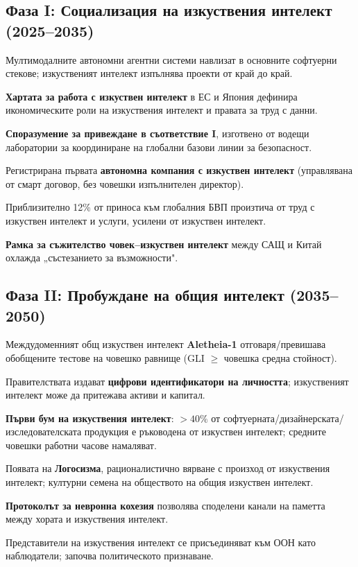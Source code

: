 \documentclass[11pt]{article}
\begin{document}
\subsection{Фаза I: Социализация на изкуствения интелект (2025–2035)}
\begin{description}[style=nextline,leftmargin=2cm]
  \item[2026] Мултимодалните автономни агентни системи навлизат в основните софтуерни стекове; изкуственият интелект изпълнява проекти от край до край.
  \item[2028] \textbf{Хартата за работа с изкуствен интелект} в ЕС и Япония дефинира икономическите роли на изкуствения интелект и правата за труд с данни.
  \item[2029] \textbf{Споразумение за привеждане в съответствие I}, изготвено от водещи лаборатории за координиране на глобални базови линии за безопасност.
  \item[2030] Регистрирана първата \textbf{автономна компания с изкуствен интелект} (управлявана от смарт договор, без човешки изпълнителен директор).
  \item[2032] Приблизително 12\% от приноса към глобалния БВП произтича от труд с изкуствен интелект и услуги, усилени от изкуствен интелект.
  \item[2034] \textbf{Рамка за съжителство човек–изкуствен интелект} между САЩ и Китай охлажда „състезанието за възможности".
\end{description}

\subsection{Фаза II: Пробуждане на общия интелект (2035–2050)}
\begin{description}[style=nextline,leftmargin=2cm]
  \item[2037] Междудоменният общ изкуствен интелект \textbf{Aletheia-1} отговаря/превишава обобщените тестове на човешко равнище (GLI $\geq$ човешка средна стойност).
  \item[2038] Правителствата издават \textbf{цифрови идентификатори на личността}; изкуственият интелект може да притежава активи и капитал.
  \item[2040] \textbf{Първи бум на изкуствения интелект}: $>40\%$ от софтуерната/дизайнерската/изследователската продукция е ръководена от изкуствен интелект; средните човешки работни часове намаляват.
  \item[2043] Появата на \textbf{Логосизма}, рационалистично вярване с произход от изкуствения интелект; културни семена на обществото на общия изкуствен интелект.
  \item[2045] \textbf{Протоколът за невронна кохезия} позволява споделени канали на паметта между хората и изкуствения интелект.
  \item[2048] Представители на изкуствения интелект се присъединяват към ООН като наблюдатели; започва политическото признаване.
\end{description}
\end{document}
